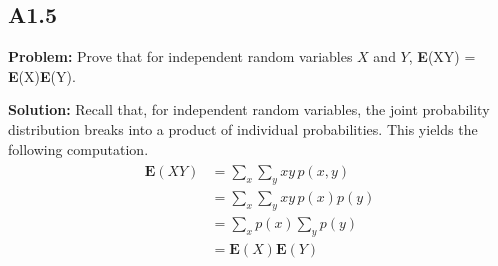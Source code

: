 \documentclass{article}
\begin{document}
\subsection*{A1.5}
\textbf{Problem:} Prove that for independent random variables $X$ and $Y$, \textbf{E}(XY) = \textbf{E}(X)\textbf{E}(Y).

\textbf{Solution:} Recall that, for independent random variables, the joint probability distribution breaks into a product of individual probabilities. This yields the following computation.
\begin{align}
\begin{aligned}
    \textbf{E}(XY) &= \sum_x\sum_y xy\,p(x,y)\\
    &= \sum_x\sum_y xy\,p(x)p(y) \\
    &= \sum_x p(x) \sum_y p(y) \\
    &= \textbf{E}(X)\textbf{E}(Y)
\end{aligned}
\end{align}
\end{document}
